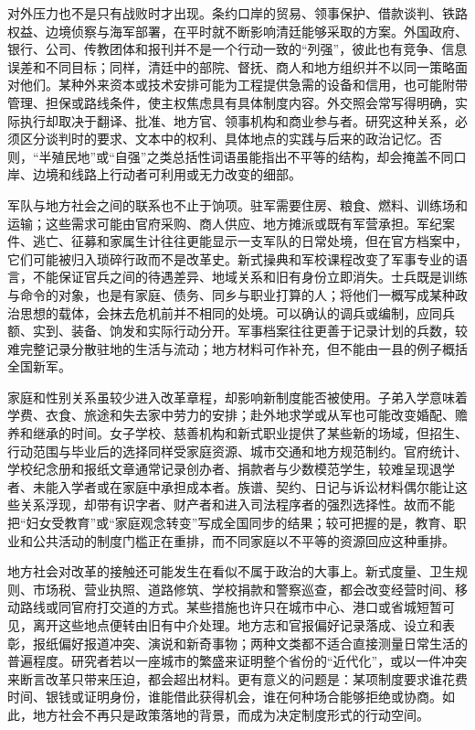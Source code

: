 对外压力也不是只有战败时才出现。条约口岸的贸易、领事保护、借款谈判、铁路权益、边境侦察与海军部署，在平时就不断影响清廷能够采取的方案。外国政府、银行、公司、传教团体和报刊并不是一个行动一致的“列强”，彼此也有竞争、信息误差和不同目标；同样，清廷中的部院、督抚、商人和地方组织并不以同一策略面对他们。某种外来资本或技术安排可能为工程提供急需的设备和信用，也可能附带管理、担保或路线条件，使主权焦虑具有具体制度内容。外交照会常写得明确，实际执行却取决于翻译、批准、地方官、领事机构和商业参与者。研究这种关系，必须区分谈判时的要求、文本中的权利、具体地点的实践与后来的政治记忆。否则，“半殖民地”或“自强”之类总括性词语虽能指出不平等的结构，却会掩盖不同口岸、边境和线路上行动者可利用或无力改变的细部。

军队与地方社会之间的联系也不止于饷项。驻军需要住房、粮食、燃料、训练场和运输；这些需求可能由官府采购、商人供应、地方摊派或既有军营承担。军纪案件、逃亡、征募和家属生计往往更能显示一支军队的日常处境，但在官方档案中，它们可能被归入琐碎行政而不是改革史。新式操典和军校课程改变了军事专业的语言，不能保证官兵之间的待遇差异、地域关系和旧有身份立即消失。士兵既是训练与命令的对象，也是有家庭、债务、同乡与职业打算的人；将他们一概写成某种政治思想的载体，会抹去危机前并不相同的处境。可以确认的调兵或编制，应同兵额、实到、装备、饷发和实际行动分开。军事档案往往更善于记录计划的兵数，较难完整记录分散驻地的生活与流动；地方材料可作补充，但不能由一县的例子概括全国新军。

家庭和性别关系虽较少进入改革章程，却影响新制度能否被使用。子弟入学意味着学费、衣食、旅途和失去家中劳力的安排；赴外地求学或从军也可能改变婚配、赡养和继承的时间。女子学校、慈善机构和新式职业提供了某些新的场域，但招生、行动范围与毕业后的选择同样受家庭资源、城市交通和地方规范制约。官府统计、学校纪念册和报纸文章通常记录创办者、捐款者与少数模范学生，较难呈现退学者、未能入学者或在家庭中承担成本者。族谱、契约、日记与诉讼材料偶尔能让这些关系浮现，却带有识字者、财产者和进入司法程序者的强烈选择性。故而不能把“妇女受教育”或“家庭观念转变”写成全国同步的结果；较可把握的是，教育、职业和公共活动的制度门槛正在重排，而不同家庭以不平等的资源回应这种重排。

地方社会对改革的接触还可能发生在看似不属于政治的大事上。新式度量、卫生规则、市场税、营业执照、道路修筑、学校捐款和警察巡查，都会改变经营时间、移动路线或同官府打交道的方式。某些措施也许只在城市中心、港口或省城短暂可见，离开这些地点便转由旧有中介处理。地方志和官报偏好记录落成、设立和表彰，报纸偏好报道冲突、演说和新奇事物；两种文类都不适合直接测量日常生活的普遍程度。研究者若以一座城市的繁盛来证明整个省份的“近代化”，或以一件冲突来断言改革只带来压迫，都会超出材料。更有意义的问题是：某项制度要求谁花费时间、银钱或证明身份，谁能借此获得机会，谁在何种场合能够拒绝或协商。如此，地方社会不再只是政策落地的背景，而成为决定制度形式的行动空间。

